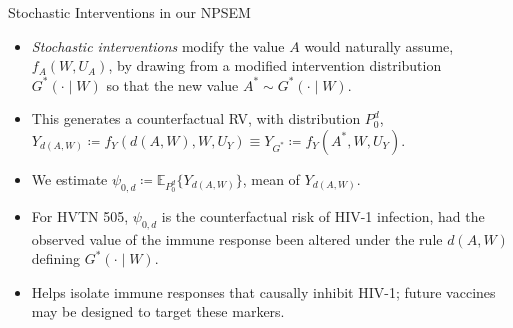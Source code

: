 \documentclass{beamer}
\newcommand{\E}{\mathbb{E}}
\begin{document}
\begin{frame}[c]{Stochastic Interventions in our NPSEM}

\begin{center}
\begin{itemize}
  \itemsep8pt
  \item \textit{Stochastic interventions} modify the value $A$ would naturally
    assume, $f_A(W, U_A)$, by drawing from a modified intervention distribution
    $G^*(\cdot \mid W)$ so that the new value $A^* \sim G^*(\cdot \mid W)$.
  \item This generates a counterfactual RV, with distribution $P_{0}^d$,
    $Y_{d(A, W)} \coloneqq f_Y(d(A,W), W, U_Y) \equiv Y_{G^*} \coloneqq
    f_Y(A^*, W, U_Y)$.
  \item We estimate $\psi_{0, d} \coloneqq \E_{P_0^d}\{Y_{d(A,W)}\}$, mean of
    $Y_{d(A, W)}$.
  \item For HVTN 505, $\psi_{0,d}$ is the counterfactual risk of HIV-1
    infection, had the observed value of the immune response been altered under
    the rule $d(A,W)$ defining $G^*(\cdot \mid W)$.
  \item Helps isolate immune responses that causally inhibit HIV-1; future
    vaccines may be designed to target these markers.
\end{itemize}
\end{center}


\end{frame}

\end{document}
